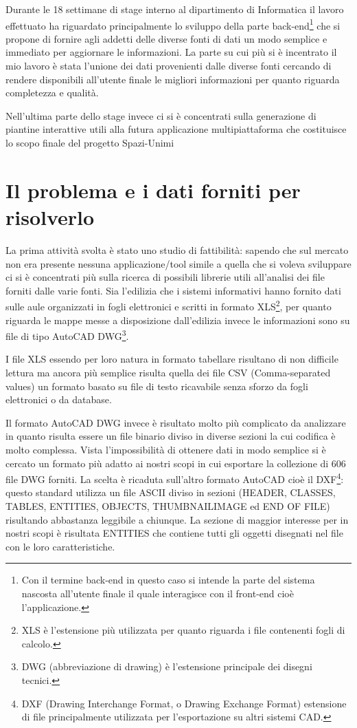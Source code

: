 \documentclass[12pt]{report}
\begin{document}
Durante le 18 settimane di stage interno al dipartimento di Informatica il lavoro effettuato ha riguardato principalmente lo sviluppo della parte back-end\footnote{Con il termine back-end in questo caso si intende la parte del sistema nascosta all'utente finale il quale interagisce con il front-end cioè l'applicazione.} che si propone di fornire agli addetti delle diverse fonti di dati un modo semplice e immediato per aggiornare le informazioni.
La parte su cui più si è incentrato il mio lavoro è stata l'unione dei dati provenienti dalle diverse fonti cercando di rendere disponibili all'utente finale le migliori informazioni per quanto riguarda completezza e qualità.

Nell'ultima parte dello stage invece ci si è concentrati sulla generazione di piantine interattive utili alla futura applicazione multipiattaforma che costituisce lo scopo finale del progetto Spazi-Unimi


\newpage
\section{Il problema e i dati forniti per risolverlo}

La prima attività svolta è stato uno studio di fattibilità: sapendo che sul mercato non era presente nessuna applicazione/tool simile a quella che si voleva sviluppare ci si è concentrati più sulla ricerca di possibili librerie utili all'analisi dei file forniti dalle varie fonti. 
Sia l'edilizia che i sistemi informativi hanno fornito dati sulle aule organizzati in fogli elettronici e scritti in formato XLS\footnote{XLS è l'estensione più utilizzata per quanto riguarda i file contenenti fogli di calcolo.}, per quanto riguarda le mappe messe a disposizione dall'edilizia invece le informazioni sono su file di tipo AutoCAD DWG\footnote{DWG (abbreviazione di drawing) è l'estensione principale dei disegni tecnici.}. 

\vspace{5mm} %

I file XLS essendo per loro natura in formato tabellare risultano di non difficile lettura ma ancora più semplice risulta quella dei file CSV (Comma-separated values) un formato basato su file di testo ricavabile senza sforzo da fogli elettronici o da database. 

Il formato AutoCAD DWG invece è risultato molto più complicato da analizzare in quanto risulta essere un file binario diviso in diverse sezioni la cui codifica è molto complessa. Vista l'impossibilità di ottenere dati in modo semplice si è cercato un formato più adatto ai nostri scopi in cui esportare la collezione di 606 file DWG forniti. La scelta è ricaduta sull'altro formato AutoCAD cioè il DXF\footnote{DXF (Drawing Interchange Format, o Drawing Exchange Format) estensione di file principalmente utilizzata per l'esportazione su altri sistemi CAD.}: questo standard utilizza un file ASCII diviso in sezioni (HEADER, CLASSES, TABLES, ENTITIES, OBJECTS, THUMBNAILIMAGE ed END OF FILE) risultando abbastanza leggibile a chiunque. La sezione di maggior interesse per in nostri scopi è risultata ENTITIES che contiene tutti gli oggetti disegnati nel file con le loro caratteristiche.
\end{document}
